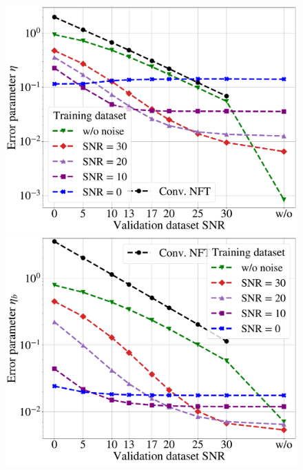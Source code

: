 \begin{figure}[tp]
\centering
\begin{minipage}{.49\textwidth}
  \centering
  \includegraphics[width=1.\linewidth]{images/nn_nft/scirep_nft_r_metric.pdf}
\end{minipage}%
\begin{minipage}{.49\textwidth}
  \centering
  \includegraphics[width=1.\linewidth]{images/nn_nft/scirep_nft_b_metric.pdf}
\end{minipage}

\end{figure}
